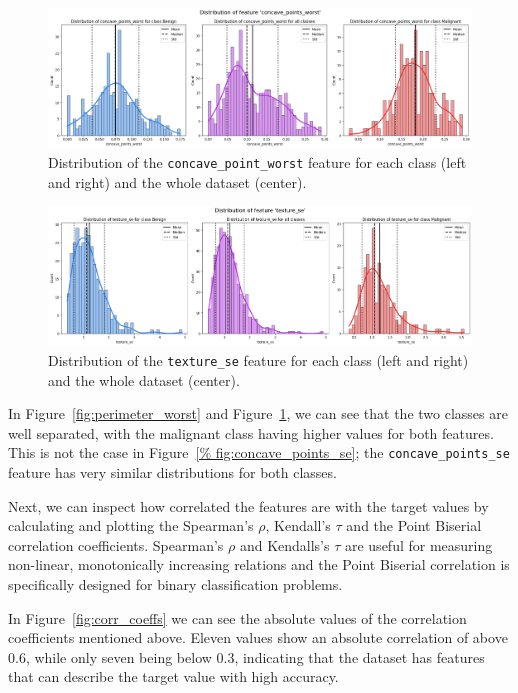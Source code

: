 \documentclass[12pt]{article}
\begin{document}
\begin{figure}[H]
    \centering
    \includegraphics[width=\textwidth]{ims/concave_points_worst.png}
    \caption{Distribution of the \texttt{concave\_point\_worst} feature for each
    class (left and right) and the whole dataset (center).}
    \label{fig:area_worst}
\end{figure}

\begin{figure}[H]
    \centering
    \includegraphics[width=\textwidth]{ims/texture_se.png}
    \caption{Distribution of the \texttt{texture\_se} feature for each class
    (left and right) and the whole dataset (center).}
    \label{fig:concave_points_se}
\end{figure}

In Figure~\ref{fig:perimeter_worst} and Figure~\ref{fig:area_worst}, we can see
that the two classes are well separated, with the malignant class having higher
values for both features. This is not the case in Figure~\ref{%
fig:concave_points_se}; the \texttt{concave\_points\_se} feature has very
similar distributions for both classes.

Next, we can inspect how correlated the features are with the target values by
calculating and plotting the Spearman's $\rho$, Kendall's $\tau$ and the Point
Biserial correlation coefficients. Spearman's $\rho$ and Kendalls's $\tau$ are
useful for measuring non-linear, monotonically increasing relations and the
Point Biserial correlation is specifically designed for binary classification
problems.

In Figure~\ref{fig:corr_coeffs} we can see the absolute values of the
correlation coefficients mentioned above. Eleven values show an absolute
correlation of above 0.6, while only seven being below 0.3, indicating that
the dataset has features that can describe the target value with high accuracy.
\end{document}
